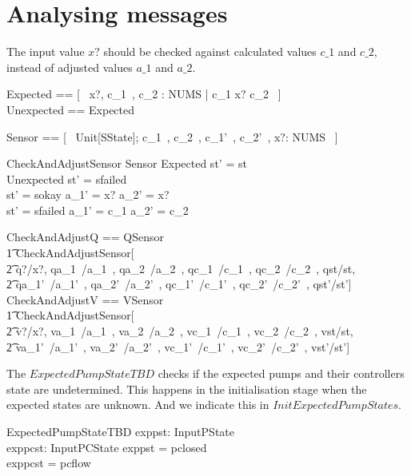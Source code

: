 \documentclass{report} %
\begin{document}
\section{Analysing messages}

The input value $x?$ should be checked against calculated values $c\_1$ and $c\_2$, instead of adjusted values $a\_1$ and $a\_2$.
\begin{zed}
  Expected == [~ x?, c\_1~, c\_2 : NUMS | c\_1 \leq x? \leq c\_2 ~] \\ %
  Unexpected == \lnot Expected 
\end{zed}

\begin{zed}
  Sensor == [~ \Delta Unit[SState]; c\_1~, c\_2~, c\_1'~, c\_2'~, x?: NUMS ~]
\end{zed}

\begin{schema}{CheckAndAdjustSensor}
  Sensor
  \where %
  Expected \implies st' = st \\ %
  Unexpected \implies st' = sfailed \\ %
  st' = sokay \implies a\_1' = x? \land a\_2' = x?  \\ %
  st' = sfailed \implies a\_1' = c\_1 \land a\_2' = c\_2
\end{schema}

\begin{zed}
  CheckAndAdjustQ == QSensor \land {} \\%
    \t1 CheckAndAdjustSensor[\\
      \t2 q?/x?, qa\_1~/a\_1~, qa\_2~/a\_2~, qc\_1~/c\_1~, qc\_2~/c\_2~, qst/st, \\ 
      \t2 qa\_1'~/a\_1'~, qa\_2'~/a\_2'~, qc\_1'~/c\_1'~, qc\_2'~/c\_2'~, qst'/st']
  \also %
  CheckAndAdjustV == VSensor \land {} \\ %
    \t1 CheckAndAdjustSensor[ \\
      \t2 v?/x?, va\_1~/a\_1~, va\_2~/a\_2~, vc\_1~/c\_1~, vc\_2~/c\_2~, vst/st, \\ 
      \t2 va\_1'~/a\_1'~, va\_2'~/a\_2'~, vc\_1'~/c\_1'~, vc\_2'~/c\_2'~, vst'/st']
\end{zed}

The $ExpectedPumpStateTBD$ checks if the expected pumps and their controllers state are undetermined. This happens in the initialisation stage when the expected states are unknown. And we indicate this in $InitExpectedPumpStates$.  
\begin{schema}{ExpectedPumpStateTBD}
  exppst: InputPState \\ %
  exppcst: InputPCState
  \where
  exppst = pclosed \\
  exppcst = pcflow
\end{schema}
\end{document}
